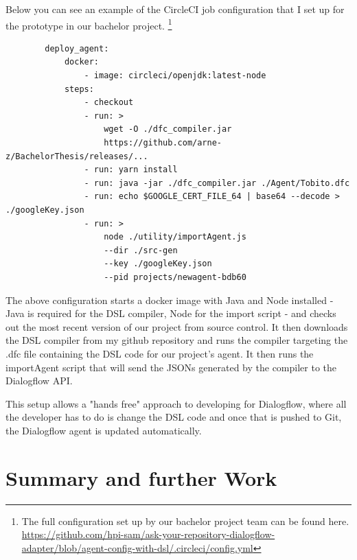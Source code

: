 Below you can see an example of the CircleCI job configuration that I set up for the prototype in our bachelor project.
\footnote{The full configuration set up by our bachelor project team can be found here.\\
\url{https://github.com/hpi-sam/ask-your-repository-dialogflow-adapter/blob/agent-config-with-dsl/.circleci/config.yml}}
\begin{samepage}    
    \begin{verbatim}
        deploy_agent:
            docker:
                - image: circleci/openjdk:latest-node
            steps:
                - checkout
                - run: > 
                    wget -O ./dfc_compiler.jar
                    https://github.com/arne-z/BachelorThesis/releases/...
                - run: yarn install
                - run: java -jar ./dfc_compiler.jar ./Agent/Tobito.dfc
                - run: echo $GOOGLE_CERT_FILE_64 | base64 --decode > ./googleKey.json
                - run: >
                    node ./utility/importAgent.js 
                    --dir ./src-gen 
                    --key ./googleKey.json 
                    --pid projects/newagent-bdb60
    \end{verbatim}
\end{samepage}

The above configuration starts a docker image with Java and Node installed - Java is required for the DSL compiler, Node for the import script - and checks out the most recent version of our project from source control.
It then downloads the DSL compiler from my github repository and runs the compiler targeting the .dfc file containing the DSL code for our project's agent.
It then runs the importAgent script that will send the JSONs generated by the compiler to the Dialogflow API.

This setup allows a "hands free" approach to developing for Dialogflow, where all the developer has to do is change the DSL code and once that is pushed to Git, the Dialogflow agent is updated automatically.


\chapter{Summary and further Work}

